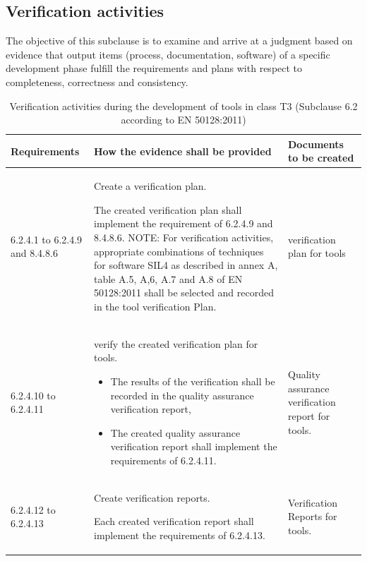 \documentclass{template/openetcs_report}
\begin{document}
\subsection{Verification activities}
\begin{flushleft}
The objective of this subclause is to examine and arrive at a judgment based on evidence that output items (process, documentation, software) of a specific development phase fulfill the requirements and plans with respect to completeness, correctness and consistency.
\end{flushleft}
{\footnotesize\sffamily\centering
\begin{longtable}{|p{2cm}|p{9cm}|p{3cm}|}
\caption{Verification activities during the development of tools in class T3 (Subclause 6.2 according to EN 50128:2011)}\\
\hline
\bfseries Requirements & \bfseries How the evidence shall be provided & \bfseries Documents to be created\\
\hline
\hline
\endhead
\hline
\endfoot

6.2.4.1 to 6.2.4.9 and 8.4.8.6 & Create a verification plan.

The created verification plan shall implement the requirement of 6.2.4.9 and 8.4.8.6.
\linebreak
\linebreak
NOTE: \linebreak
For verification activities, appropriate combinations of techniques for software SIL4 as described in annex A, table A.5, A,6, A.7 and A.8 of EN 50128:2011 shall be selected and recorded in the tool verification Plan.
& verification plan for tools\\ 
\hline
6.2.4.10 to 6.2.4.11 & verify the created verification plan for tools. 
\begin{itemize}\itemsep=0pt
  \item The results of the verification shall be recorded in the quality assurance verification report,
  \item The created quality assurance verification report shall implement the requirements of 6.2.4.11. 
\end{itemize}
& Quality assurance verification report for tools.\\ 
\hline
6.2.4.12 to 6.2.4.13 & Create verification reports.

Each created verification report shall implement the requirements of 6.2.4.13.
& Verification Reports for tools.\\ 
\hline
\end{longtable}}
\end{document}
